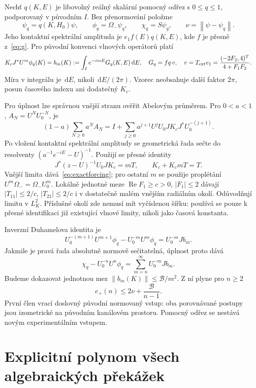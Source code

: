 \documentclass[11pt,a4paper]{article}
\newcommand{\norm}[1]{\left\lVert#1\right\rVert}
\newcommand{\dd}{\,\mathrm d}
\newcommand{\Rea}{\operatorname{Re}}
\theoremstyle{remark}\newtheorem{remark}[theorem]{Poznámka}
\numberwithin{equation}{section}
\begin{document}
Nechť \(q(K,E)\) je libovolný reálný skalární pomocný odřez s \(0\le q\le1\), podporovaný v původním \(I\). Bez přenormování položme
\[
\psi_q=q(K,H_0)\psi,\qquad \phi_q=\Omega_-\psi_q,
\qquad\chi_q=S\psi_q,
\qquad\nu=\norm{\psi-\psi_q}.
\]
Jeho kontaktní spektrální amplituda je \(e_1 f(E)q(K,E)\), kde \(f\) je přesně z~\eqref{eq:g}. Pro původní konvenci vlnových operátorů platí
\begin{equation}
K_cJ^*U^m\phi_q(K)
=b_m(K):=\int_I e^{-imE}G_q(K,E)\dd E,
\quad G_q=fq\,v,\quad
v=T_{\rm ext}e_1=\frac{(-2F_2,4)^T}{4+F_1F_2}.
\label{eq:exactforcing}
\end{equation}
Míra v integrálu je \(\dd E\), nikoli \(\dd E/(2\pi)\). Vzorec neobsahuje další faktor \(2\pi\), posun časového indexu ani dodatečný \(K_c\).

Pro úplnost lze správnou vnější stranu ověřit Abelovým průměrem. Pro \(0<a<1\), \(A_N=U^NU_0^{-N}\), je
\[
(1-a)\sum_{N\ge0}a^N A_N
=I+\sum_{j\ge0}a^{j+1}U^jU_0JK_cJ^*U_0^{-(j+1)}.
\]
Po vložení kontaktní spektrální amplitudy se geometrická řada sečte do resolventy \((a^{-1}e^{-iE}-U)^{-1}\). Použijí se přesné identity
\[
J^*(z-U)^{-1}U_0JK_c=mT,
\qquad K_c+K_cmT=T.
\]
Vnější limita dává~\eqref{eq:exactforcing}; pro ostatní \(m\) se použije proplétání \(U^m\Omega_-=\Omega_-U_0^m\). Lokálně jednotné meze \(\Rea F_1\ge c>0\), \(|F_1|\le2\) dávají \(|T_{11}|\le2/c\), \(|T_{21}|\le2/c\) i v dostatečně malém vnějším radiálním okolí. Odůvodňují limitu v \(L^2_K\). Příslušné okolí zde nemusí mít vyčíslenou šířku: používá se pouze k přesné identifikaci již existující vlnové limity, nikoli jako časová konstanta.

Inverzní Duhamelova identita je
\[
U_0^{-(m+1)}U^{m+1}\phi_q-U_0^{-m}U^m\phi_q
=U_0^{-m}Jb_m.
\]
Jakmile je pravá řada absolutně normově sečitatelná, úplnost proto dává
\begin{equation}
\chi_q-U_0^{-n}U^n\phi_q
=\sum_{m=n}^{\infty}U_0^{-m}Jb_m.
\label{eq:inverseDuhamel}
\end{equation}
Budeme dokazovat jednotnou mez \(\norm{b_m(K)}\le\mathcal B/m^2\). Z ní plyne pro \(n\ge2\)
\begin{equation}
\boxed{e_+(n)\le2\nu+\frac{\mathcal B}{n-1}.}
\label{eq:mainoutbound}
\end{equation}
První člen vrací doslovný původní normovaný vstup: oba porovnávané postupy jsou izometrické na původním kanálovém prostoru. Pomocný odřez se nestává novým experimentálním vstupem.

\section{Explicitní polynom všech algebraických překážek}
\label{sec:algebra}
\end{document}
